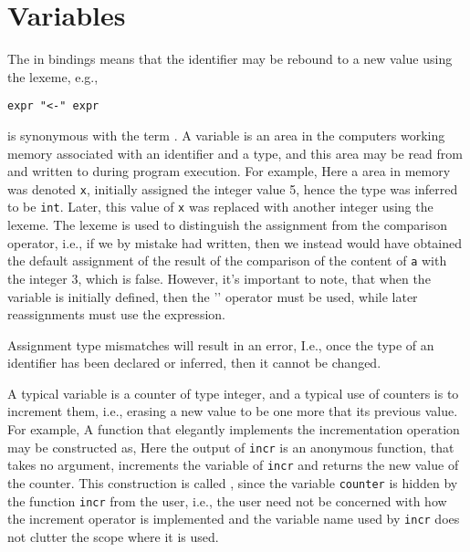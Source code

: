 \section{Variables}
\label{sec:mutableValues}
The  in  bindings means that the identifier may be rebound to a new value using the \idxs{\lexeme{<-}} lexeme, e.g.,
%
\begin{lstlisting}[language=ebnf]
expr "<-" expr
\end{lstlisting}
 is synonymous with the term . A variable is an area in the computers working memory associated with an identifier and a type, and this area may be read from and written to during program execution. For example,
%
%
Here a area in memory was denoted \texttt{x}, initially assigned the integer value 5, hence the type was inferred to be \lstinline|int|.  Later, this value of \texttt{x} was replaced with another integer using the \idx{\lexeme{<-}} lexeme. The \lexeme{<-} lexeme is used to distinguish the assignment from the comparison operator, i.e., if we by mistake had written,
%
%
%
then we instead would have obtained the default assignment of the result of the comparison of the content of \lstinline|a| with the integer 3, which is false. However, it's important to note, that when the variable is initially defined, then the '\lexeme{=}' operator must be used, while later reassignments must use the \lexeme{<-} expression.

Assignment type mismatches will result in an error, 
%
%
I.e., once the type of an identifier has been declared or inferred, then it cannot be changed.

A typical variable is a counter of type integer, and a typical use of counters is to increment them, i.e., erasing a new value to be one more that its previous value. For example,
%
%
A function that elegantly implements the incrementation operation may be constructed as,
%
%
 Here the output of \texttt{incr} is an anonymous function, that takes no argument, increments the variable of \texttt{incr} and returns the new value of the counter. This construction is called , since the variable \texttt{counter} is hidden by the function \texttt{incr} from the user, i.e., the user need not be concerned with how the increment operator is implemented and the variable name used by \texttt{incr} does not clutter the scope where it is used.

